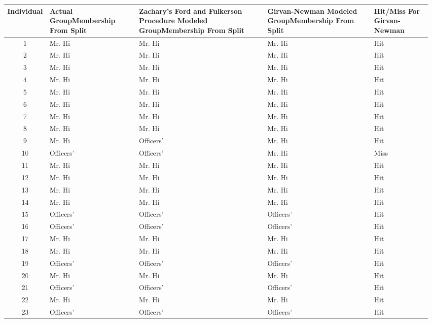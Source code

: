 \documentclass[letterpaper,11pt]{article}
\begin{document}
\clearpage
\begin{table}
\small
\begin{tabular}{ | c | p{2cm} | p{2cm} | p{2cm} | p{2cm} | }
\hline
Individual & Actual Group\newline Membership From Split & Zachary's Ford and Fulkerson Procedure Modeled Group\newline Membership From Split & Girvan-Newman Modeled Group\newline Membership From Split & Hit/Miss For Girvan-Newman\\
\hline
1 & Mr. Hi & Mr. Hi & Mr. Hi & Hit \\
\hline
2 & Mr. Hi & Mr. Hi & Mr. Hi & Hit \\
\hline
3 & Mr. Hi & Mr. Hi & Mr. Hi & Hit \\
\hline
4 & Mr. Hi & Mr. Hi & Mr. Hi & Hit \\
\hline
5 & Mr. Hi & Mr. Hi & Mr. Hi & Hit \\
\hline
6 & Mr. Hi & Mr. Hi & Mr. Hi & Hit \\
\hline
7 & Mr. Hi & Mr. Hi & Mr. Hi & Hit \\
\hline
8 & Mr. Hi & Mr. Hi & Mr. Hi & Hit \\
\hline
9 & Mr. Hi & Officers' & Mr. Hi & Hit \\
\hline
10 & Officers' & Officers' & Mr. Hi & Miss \\
\hline
11 & Mr. Hi & Mr. Hi & Mr. Hi & Hit \\
\hline
12 & Mr. Hi & Mr. Hi & Mr. Hi & Hit \\
\hline
13 & Mr. Hi & Mr. Hi & Mr. Hi & Hit \\
\hline
14 & Mr. Hi & Mr. Hi & Mr. Hi & Hit \\
\hline
15 & Officers' & Officers' & Officers' & Hit \\
\hline
16 & Officers' & Officers' & Officers' & Hit \\
\hline
17 & Mr. Hi & Mr. Hi & Mr. Hi & Hit \\
\hline
18 & Mr. Hi & Mr. Hi & Mr. Hi & Hit \\
\hline
19 & Officers' & Officers' & Officers' & Hit \\
\hline
20 & Mr. Hi & Mr. Hi & Mr. Hi & Hit \\
\hline
21 & Officers' & Officers' & Officers' & Hit \\
\hline
22 & Mr. Hi & Mr. Hi & Mr. Hi & Hit \\
\hline
23 & Officers' & Officers' & Officers' & Hit \\
\hline

\end{tabular}
\end{table}
\end{document}
